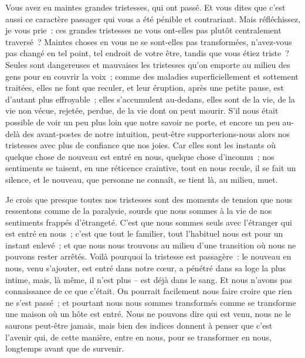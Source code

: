 {

Vous avez eu maintes grandes tristesses, qui ont passé. Et vous dites que c'est aussi ce caractère passager qui vous a été pénible et contrariant. Mais réfléchissez, je vous prie~: ces grandes tristesses ne vous ont-elles pas plutôt centralement traversé~? Maintes choses en vous ne se sont-elles pas transformées, n'avez-vous pas changé en tel point, tel endroit de votre être, tandis que vous étiez triste~? Seules sont dangereuses et mauvaises les tristesses qu'on emporte au milieu des gens pour en couvrir la voix~; comme des maladies superficiellement et sottement traitées, elles ne font que reculer, et leur éruption, après une petite pause, est d'autant plus effroyable~; elles s'accumulent au-dedans, elles sont de la vie, de la vie non vécue, rejetée, perdue, de la vie dont on peut mourir. S'il nous était possible de voir un peu plus loin que notre savoir ne porte, et encore un peu au-delà des avant-postes de notre intuition, peut-être supporterions-nous alors nos tristesses avec plus de confiance que nos joies. Car elles sont les instants où quelque chose de nouveau est entré en nous, quelque chose d'inconnu~; nos sentiments se taisent, en une réticence craintive, tout en nous recule, il se fait un silence, et le nouveau, que personne ne connaît, se tient là, au milieu, muet.

Je crois que presque toutes nos tristesses sont des moments de tension que nous ressentons comme de la paralysie, sourds que nous sommes à la vie de nos sentiments frappés d'étrangeté. C'est que nous sommes seuls avec l'étranger qui est entré en nous~; c'est que tout le familier, tout l'habituel nous est pour un instant enlevé~; et que nous nous trouvons au milieu d'une transition où nous ne pouvons rester arrêtés. Voilà pourquoi la tristesse est passagère~: le nouveau en nous, venu s'ajouter, est entré dans notre cœur, a pénétré dans sa loge la plus intime, mais, là même, il n'est plus – est déjà dans le sang. Et nous n'avons pas connaissance de ce que c'était. On pourrait facilement nous faire croire que rien ne s'est passé~; et pourtant nous nous sommes transformés comme se transforme une maison où un hôte est entré. Nous ne pouvons dire qui est venu, nous ne le saurons peut-être jamais, mais bien des indices donnent à penser que c'est l'avenir qui, de cette manière, entre en nous, pour se transformer en nous, longtemps avant que de survenir.
}

